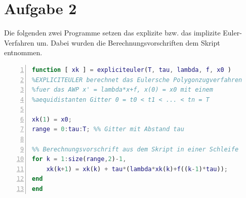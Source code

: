 \documentclass[11pt,a4paper,ngerman]{article}
\begin{document}
\newpage

\section*{Aufgabe 2}
Die folgenden zwei Programme setzen das explizite bzw. das implizite Euler-Verfahren um. Dabei wurden die Berechnungsvorschriften dem Skript entnommen.

\begin{lstlisting}[language=matlab, numbers=left]
function [ xk ] = expliciteuler(T, tau, lambda, f, x0 )
%EXPLICITEULER berechnet das Eulersche Polygonzugverfahren
%fuer das AWP x' = lambda*x+f, x(0) = x0 mit einem
%aequidistanten Gitter 0 = t0 < t1 < ... < tn = T

xk(1) = x0;
range = 0:tau:T; %% Gitter mit Abstand tau

%% Berechnungsvorschrift aus dem Skript in einer Schleife
for k = 1:size(range,2)-1,
    xk(k+1) = xk(k) + tau*(lambda*xk(k)+f((k-1)*tau));
end
end
\end{lstlisting}
\end{document}
